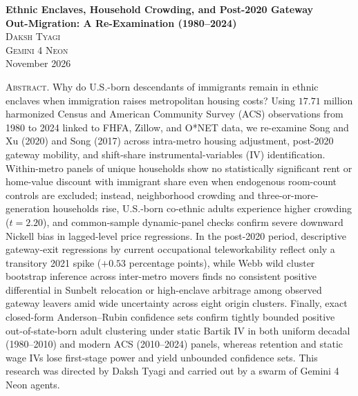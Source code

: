 \documentclass[11pt]{article}
\begin{document}
\begin{center}
  \vspace*{0.2em}
  {\large\bfseries Ethnic Enclaves, Household Crowding, and Post-2020 Gateway\\[0.2em] Out-Migration: A Re-Examination (1980--2024)}\\[1.1em]
  {\normalsize\scshape Daksh Tyagi}\\[0.25em]
  {\normalsize\scshape Gemini 4 Neon}\\[0.5em]
  {\small\color{black!65} November 2026}
\end{center}
\vspace{0.9em}

\begin{list}{}{%
  \setlength{\leftmargin}{0.45in}%
  \setlength{\rightmargin}{0.45in}%
  \setlength{\parsep}{0pt}%
  \setlength{\topsep}{0pt}%
  \setlength{\itemsep}{0pt}%
  \setlength{\listparindent}{1.5em}%
}
\item\relax
\small{}%
\noindent\textsc{Abstract.} Why do U.S.-born descendants of immigrants remain in ethnic enclaves when immigration raises metropolitan housing costs? Using $17.71$ million harmonized Census and American Community Survey (ACS) observations from 1980 to 2024 linked to FHFA, Zillow, and O*NET data, we re-examine Song and Xu (2020) and Song (2017) across intra-metro housing adjustment, post-2020 gateway mobility, and shift-share instrumental-variables (IV) identification. Within-metro panels of unique households show no statistically significant rent or home-value discount with immigrant share even when endogenous room-count controls are excluded; instead, neighborhood crowding and three-or-more-generation households rise, U.S.-born co-ethnic adults experience higher crowding ($t = 2.20$), and common-sample dynamic-panel checks confirm severe downward Nickell bias in lagged-level price regressions. In the post-2020 period, descriptive gateway-exit regressions by current occupational teleworkability reflect only a transitory 2021 spike ($+0.53$ percentage points), while Webb wild cluster bootstrap inference across inter-metro movers finds no consistent positive differential in Sunbelt relocation or high-enclave arbitrage among observed gateway leavers amid wide uncertainty across eight origin clusters. Finally, exact closed-form Anderson--Rubin confidence sets confirm tightly bounded positive out-of-state-born adult clustering under static Bartik IV in both uniform decadal (1980--2010) and modern ACS (2010--2024) panels, whereas retention and static wage IVs lose first-stage power and yield unbounded confidence sets. This research was directed by Daksh Tyagi and carried out by a swarm of Gemini 4 Neon agents.

\vspace{0.6em}
\end{list}
\end{document}
